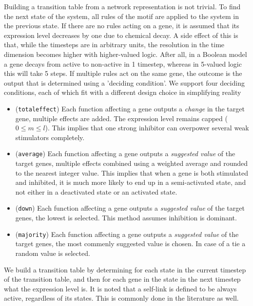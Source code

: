 \documentclass[../main.tex]{subfiles}
\begin{document}
Building a transition table from a network representation is not trivial.
To find the next state of the system, all rules of the motif are applied to the system in the previous state.
If there are no rules acting on a gene, it is assumed that its expression level decreases by one due to chemical decay.
A side effect of this is that, while the timesteps are in arbitrary units, the resolution in the time dimension becomes higher with higher-valued logic.
After all, in a Boolean model a gene decays from active to non-active in 1 timestep, whereas in 5-valued logic this will take 5 steps.
If multiple rules act on the same gene, the outcome is the output that is determined using a 'deciding condition'.
We support four deciding conditions, each of which fit with a different design choice in simplifying reality
%
\begin{itemize}
\item (\texttt{totaleffect}) Each function affecting a gene outputs a \textit{change} in the target gene, multiple effects are added. The expression level remains capped ($0 \le m \le l$). This implies that one strong inhibitor can overpower several weak stimulators completely.
\item (\texttt{average}) Each function affecting a gene outputs a \textit{suggested value} of the target genes, multiple effects combined using a weighted average and rounded to the nearest integer value. This implies that when a gene is both stimulated and inhibited, it is much more likely to end up in a semi-activated state, and not either in a deactivated state or an activated state.
\item (\texttt{down}) Each function affecting a gene outputs a \textit{suggested value} of the target genes, the lowest is selected. This method assumes inhibition is dominant.
\item (\texttt{majority}) Each function affecting a gene outputs a \textit{suggested value} of the target genes, the most commenly suggested value is chosen. In case of a tie a random value is selected.
\end{itemize}
%
We build a transition table by determining for each state in the current timestep of the transition table, and then for each gene in the state in the next timestep what the expression level is.
It is noted that a self-link is defined to be always active, regardless of its states.
This is commonly done in the literature as well.
\end{document}
